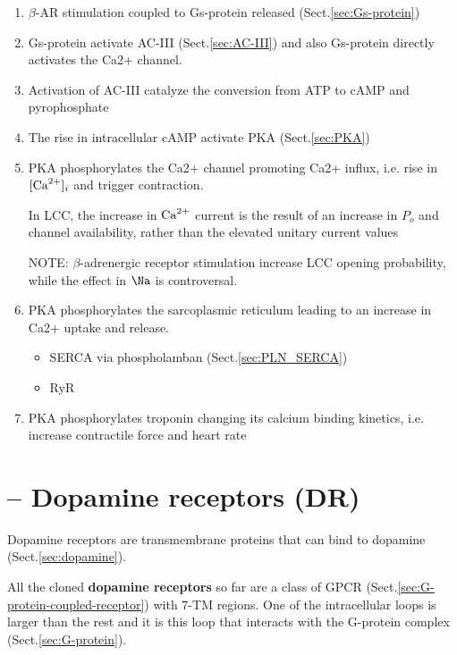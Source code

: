 \begin{enumerate}
  \item $\beta$-AR stimulation coupled to Gs-protein released
  (Sect.\ref{sec:Gs-protein})
  
  \item Gs-protein activate AC-III  (Sect.\ref{sec:AC-III})
  and also Gs-protein directly activates the Ca2+ channel.
  
  \item Activation of AC-III catalyze the conversion from ATP to cAMP and pyrophosphate
  
  \item The rise in intracellular cAMP activate PKA (Sect.\ref{sec:PKA})
  
  \item PKA phosphorylates the Ca2+ channel promoting Ca2+ influx, i.e. rise in
  $[{\text{Ca}^{2+}}]_i$ and trigger contraction.

In LCC, the increase in ${\text{Ca}^{2+}}$ current is the result of an increase in $P_o$ and
channel availability, rather than the elevated unitary current values
\citep{uehara2002, schroder1998}

NOTE: $\beta$-adrenergic receptor stimulation increase LCC opening
probability, while the effect in $\Na$ is controversal.
  
  \item PKA phosphorylates the sarcoplasmic reticulum leading to an increase in Ca2+ uptake and
  release. 
  \begin{itemize}
    \item SERCA via phospholamban (Sect.\ref{sec:PLN_SERCA})
  
    \item RyR
  \end{itemize}
  
  \item PKA phosphorylates troponin changing its calcium binding kinetics, i.e.
  increase contractile force and heart rate
 
\end{enumerate}


\section{ -- Dopamine receptors (DR)}
\label{sec:dopamine_receptors}

Dopamine receptors are transmembrane proteins that can bind to dopamine
(Sect.\ref{sec:dopamine}).


All the cloned {\bf dopamine receptors} so far are a class of GPCR
(Sect.\ref{sec:G-protein-coupled-receptor}) with 7-TM regions.
One of the intracellular loops is larger than the rest and it is this loop that
interacts with the G-protein complex (Sect.\ref{sec:G-protein}).


